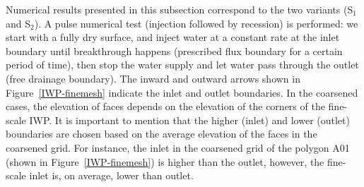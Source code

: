 Numerical results presented in this subsection correspond to the two variants (S$_1$ and S$_2$).
A pulse numerical test (injection followed by recession) is performed: we start with a fully dry surface, and inject water at a constant rate at the inlet boundary until breakthrough happens (prescribed flux boundary for a certain period of time), then stop the water supply and let water pass through the outlet (free drainage boundary).
The inward and outward arrows shown in Figure~\ref{IWP-finemesh} indicate the inlet and outlet boundaries. 
In the coarsened cases, the elevation of faces depends on the elevation of the corners of the fine-scale IWP.
It is important to mention that the higher (inlet) and lower (outlet) boundaries are chosen based on the average elevation of the faces in the coarsened grid.
For instance, the inlet in the coarsened grid of the polygon A01 (shown in Figure~\ref{IWP-finemesh}) is higher than the outlet, however, the fine-scale inlet is, on average, lower than outlet. 
%

